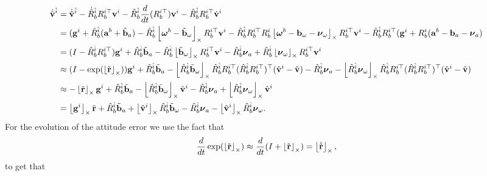 \begin{align*}
    \dot{\tilde{\mathbf{v}}}^{\hat{i}} &= \dot{\hat{\mathbf{v}}}^{\hat{i}}-\dot{\hat{R}}_b^{\hat{i}} R_b^{i\top} \mathbf{v}^i - \hat{R}_b^{\hat{i}} \frac{d}{dt}(R_b^{i\top}) \mathbf{v}^i -\hat{R}_b^{\hat{i}} R_b^{i\top} \dot{\mathbf{v}}^i \\
    &= (\mathbf{g}^i + \hat{R}_b^{\hat{i}} (\mathbf{a}^b+\hat{\mathbf{b}}_a)-\hat{R}_b^{\hat{i}} \left\lfloor\boldsymbol{\omega}^b-\hat{\mathbf{b}}_\omega\right\rfloor_{\times} R_b^{i\top} \mathbf{v}^i - \hat{R}_b^{\hat{i}} R_b^{i\top} R_b^i \left\lfloor\boldsymbol{\omega}^b-\mathbf{b}_\omega-\boldsymbol{\nu}_\omega\right\rfloor_{\times} R_b^{i\top} \mathbf{v}^i -\hat{R}_b^{\hat{i}} R_b^{i\top}(\mathbf{g}^i + R_b^i (\mathbf{a}^b-\mathbf{b}_a-\boldsymbol{\nu}_a) \\
    &= (I-\hat{R}_b^{\hat{i}}R_b^{i\top})\mathbf{g}^i + \hat{R}_b^{\hat{i}}\tilde{\mathbf{b}}_a - \hat{R}_b^{\hat{i}}\left\lfloor\tilde{\mathbf{b}}_\omega\right\rfloor_{\times} R_b^{i\top} \mathbf{v}^i 
    	- \hat{R}_b^{\hat{i}}\boldsymbol{\nu}_a + \hat{R}_b^{\hat{i}}\left\lfloor\boldsymbol{\nu}_\omega\right\rfloor_{\times} R_b^{i\top} \mathbf{v}^i  \\
    &\approx (I - \exp(\left\lfloor\tilde{\mathbf{r}}\right\rfloor_{\times}) ) \mathbf{g}^i + \hat{R}_b^{\hat{i}}\tilde{\mathbf{b}}_a - \left\lfloor\hat{R}_b^{\hat{i}}\tilde{\mathbf{b}}_\omega\right\rfloor_{\times} \hat{R}_b^{\hat{i}} R_b^{i\top} (\hat{R}_b^{\hat{i}} R_b^{i\top})^\top ( \hat{\mathbf{v}}^i - \tilde{\mathbf{v}})
    	- \hat{R}_b^{\hat{i}}\boldsymbol{\nu}_a - \left\lfloor\hat{R}_b^{\hat{i}}\boldsymbol{\nu}_\omega\right\rfloor_{\times} \hat{R}_b^{\hat{i}} R_b^{i\top} (\hat{R}_b^{\hat{i}} R_b^{i\top})^\top ( \hat{\mathbf{v}}^i - \tilde{\mathbf{v}})  \\
    &\approx -\left\lfloor\tilde{\mathbf{r}}\right\rfloor_{\times} \mathbf{g}^i + \hat{R}_b^{\hat{i}}\tilde{\mathbf{b}}_a - \left\lfloor\hat{R}_b^{\hat{i}}\tilde{\mathbf{b}}_\omega\right\rfloor_{\times}\hat{\mathbf{v}}^i
    	- \hat{R}_b^{\hat{i}}\boldsymbol{\nu}_a + \left\lfloor\hat{R}_b^{\hat{i}}\boldsymbol{\nu}_\omega\right\rfloor_{\times}\hat{\mathbf{v}}^i  \\
    &= \left\lfloor\mathbf{g}^i\right\rfloor_{\times} \tilde{\mathbf{r}} + \hat{R}_b^{\hat{i}}\tilde{\mathbf{b}}_a + \left\lfloor\hat{\mathbf{v}}^i\right\rfloor_{\times} \hat{R}_b^{\hat{i}}\tilde{\mathbf{b}}_\omega
     - \hat{R}_b^{\hat{i}}\boldsymbol{\nu}_a - \left\lfloor\hat{\mathbf{v}}^i\right\rfloor_{\times} \hat{R}_b^{\hat{i}}\boldsymbol{\nu}_\omega.
\end{align*} 
For the evolution of the attitude error we use the fact that
\[
\frac{d}{dt}\exp(\left\lfloor\tilde{\mathbf{r}}\right\rfloor_{\times}) 
    \approx \frac{d}{dt}(I + \left\lfloor\tilde{\mathbf{r}}\right\rfloor_{\times}) = \left\lfloor\dot{\tilde{\mathbf{r}}}\right\rfloor_{\times},
\]
to get that 
